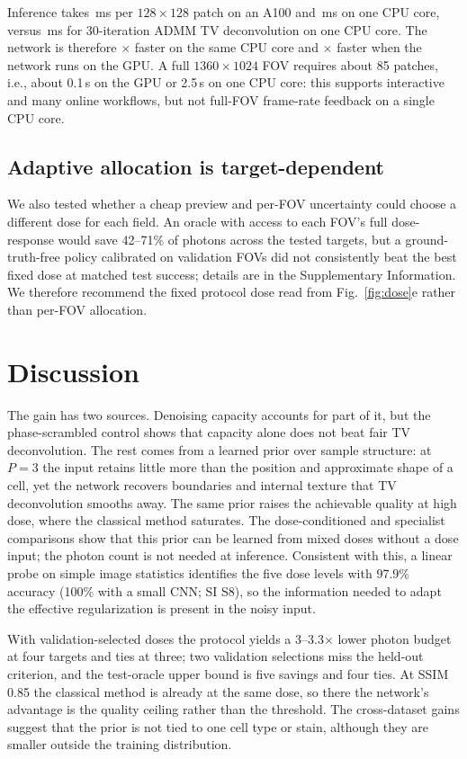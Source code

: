 \documentclass[10pt]{article}
\begin{document}
Inference takes \SpeedGPU\,ms per $128\times128$ patch on an A100 and
\SpeedCPU\,ms on one CPU core, versus \SpeedTV\,ms for 30-iteration ADMM TV
deconvolution on one CPU core. The network is therefore \SpeedFactorCPU$\times$
faster on the same CPU core and \SpeedFactorGPU$\times$ faster when the network
runs on the GPU. A full $1360\times1024$ FOV requires about 85 patches, i.e.,
about 0.1\,s on the GPU or 2.5\,s on one CPU core: this supports interactive and
many online workflows, but not full-FOV frame-rate feedback on a single CPU
core.





\subsection{Adaptive allocation is target-dependent}
We also tested whether a cheap preview and per-FOV uncertainty could choose a
different dose for each field. An oracle with access to each FOV's full
dose-response would save 42--71\% of photons across the tested targets, but a ground-truth-free policy
calibrated on validation FOVs did not consistently beat the best fixed dose at
matched test success; details are in the Supplementary Information. We
therefore recommend the fixed protocol dose read from Fig.~\ref{fig:dose}e
rather than per-FOV allocation.

\section{Discussion}
The gain has two sources. Denoising capacity accounts for part of it, but the
phase-scrambled control shows that capacity alone does not beat fair TV
deconvolution. The rest comes from a learned prior over sample structure: at
$P=3$ the input retains little more than the
position and approximate shape of a cell, yet the network recovers boundaries
and internal texture that TV deconvolution smooths away. The same prior raises
the achievable quality at high dose, where the classical method saturates. The
dose-conditioned and specialist comparisons show that this prior can be learned
from mixed doses without a dose input; the photon count is not needed at
inference. Consistent with this, a linear probe on simple image statistics
identifies the five dose levels with 97.9\% accuracy (100\% with a small CNN;
SI S8), so the information needed to adapt the effective regularization is
present in the noisy input.

With validation-selected doses the protocol yields a 3--3.3$\times$ lower
photon budget at four targets and ties at three; two validation selections miss
the held-out criterion, and the test-oracle upper bound is five savings and
four ties. At SSIM 0.85 the classical method is already at the same dose, so there
the network's advantage is the quality ceiling rather than the threshold. The
cross-dataset
gains suggest that the prior is not tied to one cell type or stain, although
they are smaller outside the training distribution.
\end{document}
